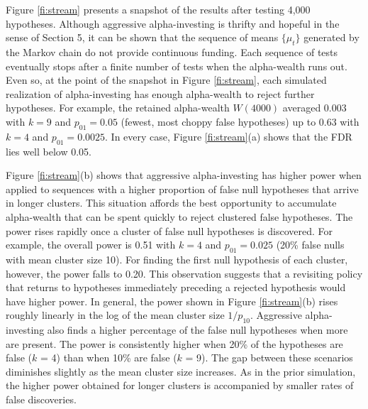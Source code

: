 \documentclass[12pt]{article}
\begin{document}
Figure \ref{fi:stream} presents a snapshot of the results after
 testing 4,000 hypotheses. Although aggressive alpha-investing is
 thrifty and hopeful in the sense of Section 5, it can be shown that
 the sequence of means $\{\mu_t\}$ generated by the Markov chain do
 not provide continuous funding.  Each sequence of tests eventually
 stops after a finite number of tests when the alpha-wealth runs out.
  Even so, at the point of the snapshot in Figure \ref{fi:stream},
 each simulated realization of alpha-investing has enough alpha-wealth
 to reject further hypotheses. For example, the retained alpha-wealth
 $W(4000)$ averaged 0.003 with $k=9$ and $p_{01} = 0.05$ (fewest, most
 choppy false hypotheses) up to 0.63 with $k=4$ and $p_{01} = 0.0025$.
  In every case, Figure \ref{fi:stream}(a) shows that the FDR lies
 well below 0.05.

Figure \ref{fi:stream}(b) shows that aggressive alpha-investing has
 higher power when applied to sequences with a higher proportion of
 false null hypotheses that arrive in longer clusters. This situation
 affords the best opportunity to accumulate alpha-wealth that can be
 spent quickly to reject clustered false hypotheses. The power rises
 rapidly once a cluster of false null hypotheses is discovered. For
 example, the overall power is 0.51 with $k=4$ and $p_{01} = 0.025$
 (20\% false nulls with mean cluster size 10).  For finding the first
 null hypothesis of each cluster, however, the power falls to 0.20.
  This observation suggests that a revisiting policy that returns to
 hypotheses immediately preceding a rejected hypothesis would have
 higher power. In general, the power shown in Figure
 \ref{fi:stream}(b) rises roughly linearly in the log of the mean
 cluster size $1/p_{10}$. Aggressive alpha-investing also finds a
 higher percentage of the false null hypotheses when more are present.
  The power is consistently higher when 20\% of the hypotheses are
 false ($k$ = 4) than when 10\% are false ($k$ = 9). The gap between
 these scenarios diminishes slightly as the mean cluster size
 increases. As in the prior simulation, the higher power obtained for
 longer clusters is accompanied by smaller rates of false discoveries.
\end{document}
